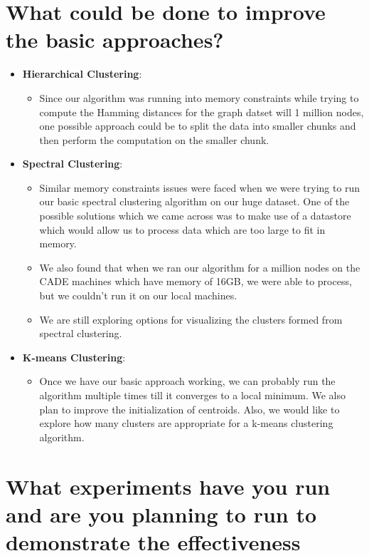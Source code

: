 \documentclass[11pt]{exam}
\begin{document}
\section{What could be done to improve the basic approaches?}

\begin{itemize}

\item \textbf{ Hierarchical Clustering}:

\begin{itemize}
	\item  Since our algorithm was running into memory constraints while trying to compute the Hamming distances for the graph datset will 1 million nodes, one possible approach could be to split the data into smaller chunks and then perform the computation on the smaller chunk.
\end{itemize}	
\item \textbf{ Spectral Clustering}:
\begin{itemize}
	\item Similar memory constraints issues were faced when we were trying to run our basic spectral clustering algorithm on our huge dataset. One of the possible solutions which we came across was to make use of a datastore which would allow us to process data which are too large to fit in memory.
	\item We also found that when we ran our algorithm for a million nodes on the CADE machines which have memory of 16GB, we were able to process, but we couldn't run it on our local machines.
	\item We are still exploring options for visualizing the clusters formed from spectral clustering.
\end{itemize}

\item \textbf{ K-means Clustering}:
\begin{itemize}

\item Once we have our basic approach working, we can probably run the algorithm multiple times till it converges to a local minimum. We also plan to improve the initialization of centroids. Also, we would like to explore how many clusters are appropriate for a k-means clustering algorithm.

\end{itemize}

\end{itemize}
\section{What experiments have you run and are you planning to run to demonstrate the effectiveness}
\end{document}
